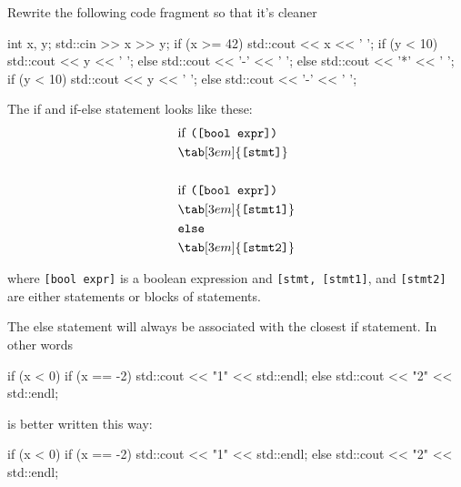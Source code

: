 \begin{ex}
Rewrite the following code fragment so that it's
cleaner
\begin{console}
int x, y;
std::cin >> x >> y;
if (x >= 42)
{
    std::cout << x << ' ';
    if (y < 10)
    {
        std::cout << y << ' ';
    }
    else
    {
        std::cout << '-' << ' ';
    }
}
else
{
     std::cout << '*' << ' ';
     if (y < 10)
     {
        std::cout << y << ' ';
     }
     else
     {
        std::cout << '-' << ' ';
     }
}
\end{console}
\end{ex}

\newpage{}

The if and if-else statement looks like these:
\begin{align*}
&\text{if \texttt{([bool expr])}}\\
&\tab[3em]{\texttt{[stmt]}}\\\\
&\text{if \texttt{([bool expr])}}\\
&\tab[3em]{\texttt{[stmt1]}}\\
&\texttt{else}\\
&\tab[3em]{\texttt{[stmt2]}}\\
\end{align*}

where \texttt{[bool expr]} is a boolean expression and
\texttt{[stmt, [stmt1]}, and \texttt{[stmt2]} are either
statements or blocks of statements.

The else statement will always be associated with the closest if
statement. In other words
\begin{console}
if (x < 0)
   if (x == -2) std::cout << "1" << std::endl;
else
      std::cout << "2" << std::endl;
\end{console}

is better written this way:
\begin{console}
if (x < 0)
   if (x == -2)
       std::cout << "1" << std::endl;
   else
       std::cout << "2" << std::endl;
\end{console}

